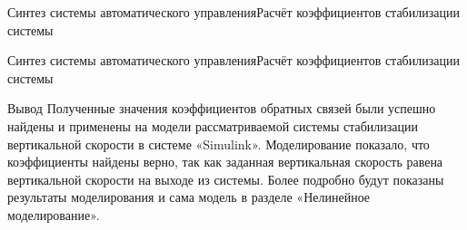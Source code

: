\begin{frame}{Синтез системы автоматического управления}{Расчёт коэффициентов стабилизации системы}
    \begin{minipage}[c]{0.45\textwidth}
    \end{minipage}
    \begin{minipage}[c]{0.45\textwidth}
    \end{minipage}
\end{frame}

\begin{frame}{Синтез системы автоматического управления}{Расчёт коэффициентов стабилизации системы}
    \begin{block}{Вывод}
        Полученные значения коэффициентов обратных связей были успешно найдены и применены на модели рассматриваемой 
        системы стабилизации вертикальной скорости в системе «Simulink». Моделирование показало, что коэффициенты найдены верно, 
        так как заданная вертикальная скорость равена вертикальной скорости на выходе из системы. 
        Более подробно будут показаны результаты моделирования и сама модель в разделе «Нелинейное моделирование».
    \end{block}
\end{frame}

